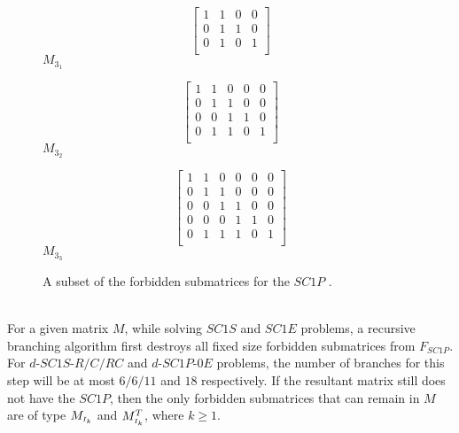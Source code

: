 \documentclass[review, 1p]{elsarticle}
\begin{document}
\begin{figure}[t]
   \begin{minipage}{.35\linewidth}
    \centering
    \[\left[\begin{array}{cccc}
      1 & 1 & 0 & 0 \\          
      0 & 1 & 1 & 0 \\
      0 & 1 & 0 & 1 \\
    \end{array}\right]\]
    \textbf{$M_{3_{1}}$}
   \end{minipage}
   \begin{minipage}{.3\linewidth}
    \centering
    \[\left[\begin{array}{ccccc}
      1 & 1 & 0 & 0 & 0\\  
      0 & 1 & 1 & 0 & 0\\  
      0 & 0 & 1 & 1 & 0\\  
      0 & 1 & 1 & 0 & 1\\          
    \end{array}\right]\]
  \noindent \textbf{$M_{3_{2}}$}
   \end{minipage}
   \begin{minipage}{.3\linewidth}
    \centering
    \[\left[\begin{array}{cccccc}
      1 & 1 & 0 & 0 & 0 & 0 \\    
      0 & 1 & 1 & 0 & 0 & 0 \\  
      0 & 0 & 1 & 1 & 0 & 0 \\ 
      0 & 0 & 0 & 1 & 1 & 0 \\ 
      0 & 1 & 1 & 1 & 0 & 1 \\ 
    \end{array}\right]\]
    \textbf{\hspace{0.3 in}$M_{3_{3}}$}
   \end{minipage}
  \caption{A subset of the forbidden submatrices for the $SC1P$  \cite{tucker1972structure}.\label{forbidden}}
\end{figure}\\

\noindent For a given matrix $M$, while solving $SC1S$ and $SC1E$ problems, a recursive branching algorithm first destroys all fixed size forbidden submatrices from $F_{SC1P}$. For $d$-$SC1S$-$R/C/RC$  and $d$-$SC1P$-$0E$ problems, the number of branches for this step will be at most $6/6/11$ and $18$ respectively. If the resultant matrix still does not have the $SC1P$, then the only forbidden submatrices that can remain in $M$ are of type $M_{\mathsmaller{I_{k}}}$ and $M^{T}_{\mathsmaller{I_{k}}}$, where $k \geq 1$. 
\end{document}
